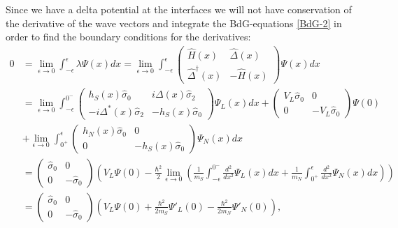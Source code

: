 Since we have a delta potential at the interfaces we will not have conservation of the derivative of the wave vectors and integrate the BdG-equations \eqref{BdG-2} in order to find the boundary conditions for the derivatives:
\begin{equation*}
\begin{split}
    0 &= \lim_{\epsilon \rightarrow 0} \int_{-\epsilon}^{\epsilon} \lambda\Psi(x) dx = \lim_{\epsilon \rightarrow 0} \int_{-\epsilon}^{\epsilon}
    \begin{pmatrix}
    \hat{H}(x) & \hat{\Delta}(x) \\
    \hat{\Delta}^{\dagger}(x) & -\hat{H}(x)
    \end{pmatrix}
    \Psi(x)dx
    \\
    &=\lim_{\epsilon \rightarrow 0} \int_{-\epsilon}^{0^-}
    \begin{pmatrix}
    h_S(x)\hat{\sigma}_0 & i\Delta(x)\hat{\sigma}_2 \\
    -i\Delta^*(x)\hat{\sigma}_2 & -h_S(x)\hat{\sigma}_0
    \end{pmatrix}
    \Psi_{L}(x)dx
    +
    \begin{pmatrix}
    V_L\hat{\sigma}_0 & 0\\
    0 & -V_L\hat{\sigma}_0
    \end{pmatrix}
    \Psi(0)
    \\
    &+\lim_{\epsilon \rightarrow 0} \int_{0^+}^{\epsilon}
    \begin{pmatrix}
    h_N(x)\hat{\sigma}_0 & 0 \\
    0 & -h_S(x)\hat{\sigma}_0
    \end{pmatrix}
    \Psi_{N}(x)dx\\
    &=
    \begin{pmatrix}
    \hat{\sigma}_0 & 0\\
    0 & -\hat{\sigma}_0
    \end{pmatrix}
    \left(
    V_L\Psi(0)
    -\frac{\hbar^2}{2}
    \lim_{\epsilon \rightarrow 0}
    \left( \frac{1}{m_S}\int_{-\epsilon}^{0^-} 
    \frac{d^2}{dx^2} \Psi_L(x) dx
    + \frac{1}{m_N}\int_{0^+}^{\epsilon} 
    \frac{d^2}{dx^2} \Psi_N(x) dx \right)
    \right)\\
    &=
    \begin{pmatrix}
    \hat{\sigma}_0 & 0\\
    0 & -\hat{\sigma}_0
    \end{pmatrix}
    \left(
    V_L\Psi(0) +
    \frac{\hbar^2}{2m_S}
    \Psi'_L(0)
    -  \frac{\hbar^2}{2m_N}
    \Psi'_N(0) 
    \right),
\end{split}
\end{equation*}
